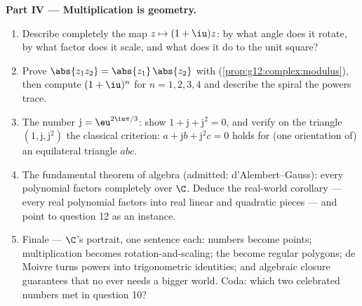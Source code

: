 \begin{problem}
\medskip
\noindent\textbf{Part IV --- Multiplication is geometry.}
\begin{enumerate}[resume]
  \item Describe completely the map $z \mapsto (1 + \iu)z$:
        by what angle does it rotate, by what factor does it
        scale, and what does it do to the unit square?
  \item Prove $\abs{z_1 z_2} = \abs{z_1}\,\abs{z_2}$ with
         (\cref{prop:g12:complex:modulus}), then
        compute $(1+\iu)^n$ for $n = 1, 2, 3, 4$ and describe
        the spiral the powers trace.
  \item The number $\mathrm{j} = \eu^{2\iu\pi/3}$: show
        $1 + \mathrm{j} + \mathrm{j}^2 = 0$, and verify on the triangle
        $\left(1, \mathrm{j}, \mathrm{j}^2\right)$ the classical criterion:
        $a + \mathrm{j} b + \mathrm{j}^2 c = 0$ holds for (one orientation
        of) an equilateral triangle $abc$.
  \item The fundamental theorem of algebra (admitted:
        d'Alembert--Gauss): every polynomial factors completely
        over $\C$. Deduce the real-world corollary --- every
        real polynomial factors into real linear and quadratic
        pieces --- and point to question 12 as an instance.
  \item Finale --- $\C$'s portrait, one sentence each: numbers
        become points; multiplication becomes
        rotation-and-scaling; the  become regular
        polygons; de Moivre turns powers into trigonometric
        identities; and algebraic closure guarantees that no
         ever needs a bigger world. Coda: which two
        celebrated numbers met in question 10?
\end{enumerate}
\end{problem}
